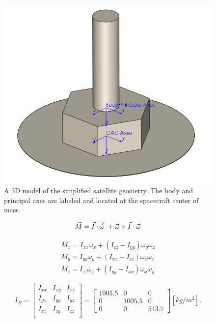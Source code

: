 \begin{figure}[H]
\centering
\includegraphics[scale=0.7]{Images/WMAP_CAD4.PNG}
\caption{A 3D model of the simplified satellite geometry. The body and principal axes are labeled and located at the spacecraft center of mass.}
\label{CAD model with frames}
\end{figure}


\begin{equation}
\vec{M} = \vec{I} \cdot \vec{\dot{\omega}}\ + \vec{\omega} \times \vec{I} \cdot \vec{\omega} \\ 
\end{equation}   

\begin{eqnarray}
M_x = I_{xx} \dot{\omega_x} + (I_{zz} - I_{yy})\omega_y \omega_z \nonumber \\
M_y = I_{yy} \dot{\omega_y} + (I_{xx} - I_{zz})\omega_z \omega_x \\
M_z = I_{zz} \dot{\omega_z} + (I_{yy} - I_{xx})\omega_x \omega_y \nonumber
\end{eqnarray}

\begin{equation}
I_{B} =
\begin{bmatrix} 
I_{xx} & I_{xy} & I_{xz} \\
I_{yx} & I_{yy} & I_{yz} \\ 
I_{zx} & I_{zy} & I_{zz} \\
\end{bmatrix}
=
\begin{bmatrix}
1005.5 & 0 & 0 \\
0 & 1005.5 & 0 \\ 
0 & 0 & 543.7
\end{bmatrix}
[kg/m^2].
\end{equation}
